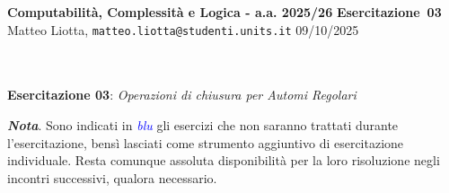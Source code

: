 \documentclass[a4paper,10pt]{article}
\makeatletter
\newcommand{\EsercitazioneNum}{03}
\newcommand{\Data}{09/10/2025}
\newcommand{\DocType}{Esercitazione} %
\newcommand{\FullTitle}{\DocType\ \EsercitazioneNum}
\newcommand{\Header}{
\noindent
  \small \textbf{Computabilità, Complessità e Logica - a.a. 2025/26} \hfill \textbf{\FullTitle} \\[0.2cm]
  \scriptsize Matteo Liotta, \texttt{matteo.liotta@studenti.units.it} \hfill \Data \\[0.2cm]
  \noindent\makebox[\linewidth]{\rule{\linewidth}{0.4pt}} \\[0.3cm]}
\makeatother
\begin{document}
\footnotesize  %
\Header\\[0.7cm]


\noindent\Large \textbf{Esercitazione \EsercitazioneNum}: \textit{Operazioni di chiusura per Automi Regolari}
\begin{osservazioni}
    \textbf{\textit{Nota}}. Sono indicati in \textcolor{blue}{\textit{blu}} gli esercizi che non saranno trattati durante l'esercitazione, bensì lasciati come strumento aggiuntivo di esercitazione individuale. Resta comunque assoluta disponibilità per la loro risoluzione negli incontri successivi, qualora necessario.
\end{osservazioni}
\end{document}
